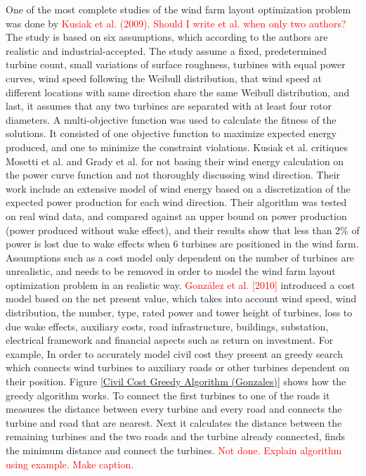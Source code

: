 \noindent One of the most complete studies of the wind farm layout optimization problem was done by \textcolor{red}{Kusiak et al. (2009)}. \textcolor{red}{Should I write et al. when only two authors?} The study is based on six assumptions, which according to the authors are realistic and industrial-accepted. The study assume a fixed, predetermined turbine count, small variations of surface roughness, turbines with equal power curves, wind speed following the Weibull distribution, that wind speed at different locations with same direction share the same Weibull distribution, and last, it assumes that any two turbines are separated with at least four rotor diameters. A multi-objective function was used to calculate the fitness of the solutions. It consisted of one objective function to maximize expected energy produced, and one to minimize the constraint violations. Kusiak et al. critiques Mosetti et al. and Grady et al. for not basing their wind energy calculation on the power curve function and not thoroughly discussing wind direction. Their work include an extensive model of wind energy based on a discretization of the expected power production for each wind direction. Their algorithm was tested on real wind data, and compared against an upper bound on power production (power produced without wake effect), and their results show that less than 2\% of power is lost due to wake effects when 6 turbines are positioned in the wind farm. \\


\noindent Assumptions such as a cost model only dependent on the number of turbines are unrealistic, and needs to be removed in order to model the wind farm layout optimization problem in an realistic way.  \textcolor{red}{González et al. [2010]} introduced a cost model based on the net present value, which takes into account wind speed, wind distribution, the number, type, rated power and tower height of turbines, loss to due wake effects, auxiliary costs, road infrastructure, buildings, substation, electrical framework and financial aspects such as return on investment. For example, In order to accurately model civil cost they present an greedy search which connects wind turbines to auxiliary roads or other turbines dependent on their position. Figure \ref{Civil Cost Greedy Algorithm (Gonzales)} shows how the greedy algorithm works. To connect the first turbines to one of the roads it measures the distance between every turbine and every road and connects the turbine and road that are nearest. Next it calculates the distance between the remaining turbines and the two roads and the turbine already connected, finds the minimum distance and connect the turbines. \textcolor{red}{Not done. Explain algorithm using example. Make caption.}


